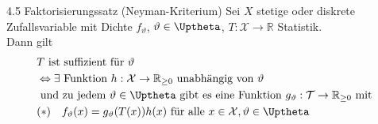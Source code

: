 \documentclass[a4paper,openany]{book}
\theoremstyle{mytheoremstyle}
\theoremstyle{mytheoremstyle2}
\begin{document}
\begin{theo}{4.5 Faktorisierungssatz (Neyman-Kriterium)}{}
  Sei $X$ stetige oder diskrete Zufallsvariable mit Dichte $f _{\vartheta }$, $\vartheta \in \Uptheta$, $T:\mathcal{X}\to \mathbb{R}$ Statistik.\\
  Dann gilt 
  \begin{align*}
    &T \text{ ist suffizient für }\vartheta \\
    &\Leftrightarrow \exists\text{ Funktion }h:\mathcal{X}\to \mathbb{R}_{\geq 0} \text{ unabhängig von }\vartheta  \\
    & \text{ und zu jedem }\vartheta \in \Uptheta \text{ gibt es eine Funktion }g _{\vartheta }:\mathcal{T}\to \mathbb{R}_{\geq 0} \text{ mit } \\
    &(*)\quad f _{\vartheta }(x)=g _{\vartheta }(T(x))h(x) \text{ für alle }x \in \mathcal{X},\vartheta \in \Uptheta
  \end{align*}
\end{theo}
\end{document}

